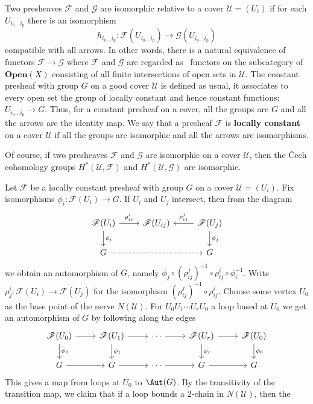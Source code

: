 Two presheaves $\mathscr{F}$ and $\mathscr{G}$ are isomorphic relative to a cover $\mathcal{U}=(U_i)$ if for each $U_{i_0\dots i_p}$ there is an isomorphism
\[h_{i_0\dots i_p}:\mathscr{F}(U_{i_0\dots i_p})\to\mathscr{G}(U_{i_0\dots i_p})\]
compatible with all arrows. In other words, there is a natural equivalence of functors $\mathscr{F}\to\mathscr{G}$ where $\mathscr{F}$ and $\mathscr{G}$ are regarded as \
functors on the subcategory of $\mathbf{Open}(X)$ consisting of all finite intersections of open sets in $\mathcal{U}$. The constant presheaf with group $G$ on a good 
cover $\mathcal{U}$ is defined as usual, it associates to every open set the group of locally constant and hence constant functions: $U_{i_0\dots i_p}\to G$. Thus, for 
a constant presheaf on a cover, all the groups are $G$ and all the arrows are the identity map. We say that a presheaf $\mathscr{F}$ is \textbf{locally constant} 
on a cover $\mathcal{U}$ if all the groups are isomorphic and all the arrows are isomorphisms.\par
Of course, if two presheaves $\mathscr{F}$ and $\mathscr{G}$ are isomorphic on a cover $\mathcal{U}$, then the \v{C}ech cohomology groups $H^*(\mathcal{U},\mathscr{F})$ 
and $H^*(\mathcal{U},\mathscr{G})$ are isomorphic.\par
Let $\mathscr{F}$ be a locally constant presheaf with group $G$ on a cover $\mathcal{U}=(U_i)$. Fix isomorphisms $\phi_i:\mathscr{F}(U_i)\to G$. If $U_i$ and $U_j$ 
intersect, then from the diagram
\[\begin{tikzcd}
\mathscr{F}(U_i)\ar[d,"\phi_i"]\ar[r,"\rho^i_{ij}"]&\mathscr{F}(U_{ij})&\mathscr{F}(U_j)\ar[l,swap,"\rho^j_{ij}"]\ar[d,"\phi_j"]\\
G\ar[rr,dashed]&&G
\end{tikzcd}\]
we obtain an automorphism of $G$, namely $\phi_j\circ(\rho_{ij}^j)^{-1}\circ\rho^i_{ij}\circ\phi_i^{-1}$. Write $\rho^i_j:\mathscr{F}(U_i)\to\mathscr{F}(U_j)$ for the 
isomorphism $(\rho_{ij}^j)^{-1}\circ\rho^i_{ij}$. Choose some vertex $U_0$ as the base point of the nerve $N(\mathcal{U})$. For $U_0U_1\cdots U_rU_0$ a loop based at 
$U_0$ we get an automorphism of $G$ by following along the edges
\[\begin{tikzcd}
\mathscr{F}(U_0)\ar[d,"\phi_0"]\ar[r]&\mathscr{F}(U_1)\ar[d,"\phi_1"]\ar[r]&\cdots\ar[r]&\mathscr{F}(U_r)\ar[d,"\phi_r"]\ar[r]&\mathscr{F}(U_0)\ar[d,"\phi_0"]\\
G\ar[r]&G\ar[r]&\cdots\ar[r]&G\ar[r]&G
\end{tikzcd}\]
This gives a map from loops at $U_0$ to $\Aut(G)$. By the transitivity of the transition map, we claim that if a loop bounds a $2$-chain in $N(\mathcal{U})$, then the 
